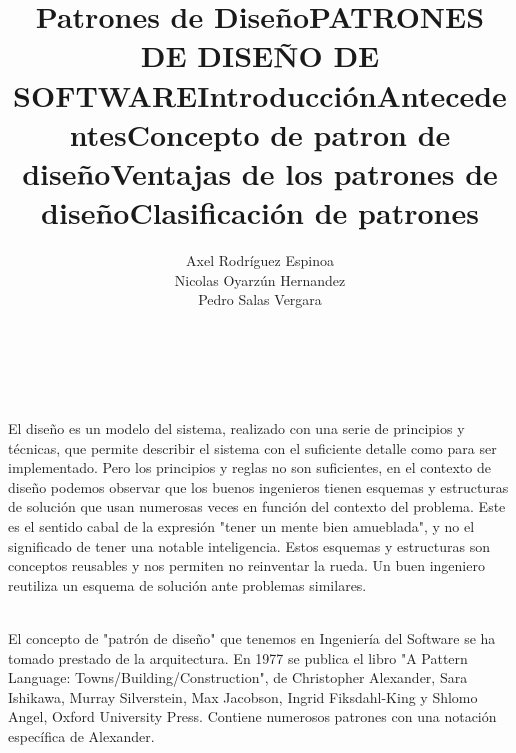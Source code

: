 \documentclass[a4paper,11pt]{report}
\begin{document}
\title{Patrones de Diseño}
\author{Axel Rodríguez Espinoa\\
        Nicolas Oyarzún Hernandez\\
        Pedro Salas Vergara}
\maketitle

\title {\textbf{PATRONES DE DISEÑO DE SOFTWARE}}\\

\title{\textbf{Introducción}}\\

El diseño es un modelo del sistema, realizado con una serie de principios y técnicas, que permite describir el sistema con el suficiente detalle como para ser implementado. Pero los principios y reglas no son suficientes, en el contexto de diseño podemos observar que los buenos ingenieros tienen esquemas y estructuras de solución que usan numerosas veces en función del contexto del problema. Este es el sentido cabal de la expresión "tener un mente bien amueblada", y no el significado de tener una notable inteligencia. Estos esquemas y estructuras son conceptos reusables y nos permiten no reinventar la rueda. Un buen ingeniero reutiliza un esquema de solución ante problemas similares.\\

\title{\textbf{Antecedentes}}\\

El concepto de "patrón de diseño" que tenemos en Ingeniería del Software se ha tomado prestado de la arquitectura. En 1977 se publica el libro "A Pattern Language: Towns/Building/Construction", de Christopher Alexander, Sara Ishikawa, Murray Silverstein, Max Jacobson, Ingrid Fiksdahl-King y Shlomo Angel, Oxford University Press. Contiene numerosos patrones con una notación específica de Alexander.\\

\title{\textbf{Concepto de patron de diseño}}\\



\title{\textbf{Ventajas de los patrones de diseño}}\\



\title{\textbf{Clasificación de patrones}}\\
\end{document}
